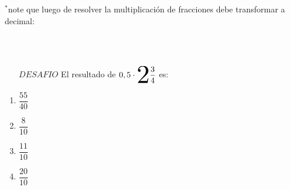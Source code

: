 \documentclass[12pt]{article}
\begin{document}
\begin{enumerate}
\begin{enumerate}
		$^*$note que luego de resolver la multiplicación de fracciones debe transformar a decimal:
	\end{enumerate}
\ \\ \ \\
 \begin{enumerate}
 	\item [$DESAFIO$]  El resultado de $0,5 \cdot \scalerel{2}{\dfrac{3}{4}}$ es: 
 \end{enumerate}
 	\begin{enumerate}
 		\item $\dfrac{55}{40}$\\
 		\item $\dfrac{8}{10}$\\
 		\item $\dfrac{11}{10}$\\
 		\item $\dfrac{20}{10}$\\
 	
 	\end{enumerate}

\end{enumerate}
\end{document}
